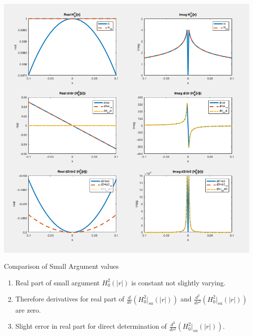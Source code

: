 \documentclass{article}
\newcommand{\0}{\varnothing}
\begin{document}
\begin{minipage}{0.7\textwidth}
\includegraphics[width=1\columnwidth]{figures/OneDGreensFct}
\end{minipage}
\begin{minipage}{0.3\textwidth}
    {\centering Comparison of Small Argument values\ \\}
    \begin{enumerate}
        \item Real part of small argument $H_0^2(|r|)$ is constant not slightly varying. 
        \item Therefore derivatives for real part of $\frac{d}{dr}\left(H_0^2|_{sa} (|r|)\right)$ and $\frac{d^2}{dr^2}\left(H_0^2|_{sa} (|r|)\right)$ are zero.
        \item Slight error in real part for direct determination of $\frac{d^2}{dr^2}\left(H_0^2|_{sa} (|r|)\right)$.
    \end{enumerate}
\end{minipage}
\end{document}
